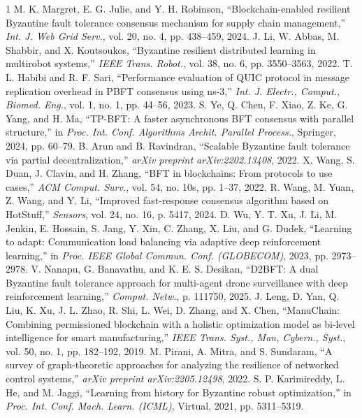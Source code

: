 \documentclass[lettersize,journal]{IEEEtran}
\begin{document}
\begin{thebibliography}{1}
M. K. Margret, E. G. Julie, and Y. H. Robinson, ``Blockchain-enabled resilient Byzantine fault tolerance consensus mechanism for supply chain management,'' \textit{Int. J. Web Grid Serv.}, vol. 20, no. 4, pp. 438--459, 2024.
J. Li, W. Abbas, M. Shabbir, and X. Koutsoukos, ``Byzantine resilient distributed learning in multirobot systems,'' \textit{IEEE Trans. Robot.}, vol. 38, no. 6, pp. 3550--3563, 2022.
T. L. Habibi and R. F. Sari, ``Performance evaluation of QUIC protocol in message replication overhead in PBFT consensus using ns-3,'' \textit{Int. J. Electr., Comput., Biomed. Eng.}, vol. 1, no. 1, pp. 44--56, 2023.
S. Ye, Q. Chen, F. Xiao, Z. Ke, G. Yang, and H. Ma, ``TP-BFT: A faster asynchronous BFT consensus with parallel structure,'' in \textit{Proc. Int. Conf. Algorithms Archit. Parallel Process.}, Springer, 2024, pp. 60--79.
B. Arun and B. Ravindran, ``Scalable Byzantine fault tolerance via partial decentralization,'' \textit{arXiv preprint arXiv:2202.13408}, 2022.
X. Wang, S. Duan, J. Clavin, and H. Zhang, ``BFT in blockchains: From protocols to use cases,'' \textit{ACM Comput. Surv.}, vol. 54, no. 10s, pp. 1--37, 2022.
R. Wang, M. Yuan, Z. Wang, and Y. Li, ``Improved fast-response consensus algorithm based on HotStuff,'' \textit{Sensors}, vol. 24, no. 16, p. 5417, 2024.
D. Wu, Y. T. Xu, J. Li, M. Jenkin, E. Hossain, S. Jang, Y. Xin, C. Zhang, X. Liu, and G. Dudek, ``Learning to adapt: Communication load balancing via adaptive deep reinforcement learning,'' in \textit{Proc. IEEE Global Commun. Conf. (GLOBECOM)}, 2023, pp. 2973--2978.
V. Nanapu, G. Banavathu, and K. E. S. Desikan, ``D2BFT: A dual Byzantine fault tolerance approach for multi-agent drone surveillance with deep reinforcement learning,'' \textit{Comput. Netw.}, p. 111750, 2025.
J. Leng, D. Yan, Q. Liu, K. Xu, J. L. Zhao, R. Shi, L. Wei, D. Zhang, and X. Chen, ``ManuChain: Combining permissioned blockchain with a holistic optimization model as bi-level intelligence for smart manufacturing,'' \textit{IEEE Trans. Syst., Man, Cybern., Syst.}, vol. 50, no. 1, pp. 182--192, 2019.
M. Pirani, A. Mitra, and S. Sundaram, ``A survey of graph-theoretic approaches for analyzing the resilience of networked control systems,'' \textit{arXiv preprint arXiv:2205.12498}, 2022.
S. P. Karimireddy, L. He, and M. Jaggi, ``Learning from history for Byzantine robust optimization,'' in \textit{Proc. Int. Conf. Mach. Learn. (ICML)}, Virtual, 2021, pp. 5311--5319.

\end{thebibliography}
\end{document}
